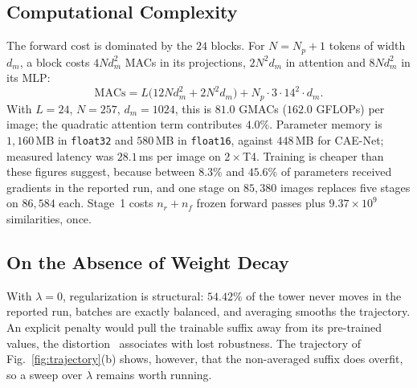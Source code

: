 \documentclass[10pt,journal]{IEEEtran}
\begin{document}
\subsection{Computational Complexity}
The forward cost is dominated by the $24$ blocks. For $N=N_p+1$ tokens of width
$d_m$, a block costs $4Nd_m^2$ MACs in its projections, $2N^2d_m$ in attention
and $8Nd_m^2$ in its MLP:
\begin{equation}
\mathrm{MACs}=L\big(12Nd_m^2+2N^2d_m\big)+N_p\cdot3\cdot14^2\cdot d_m .
\label{eq:macs}
\end{equation}
With $L=24$, $N=257$, $d_m=1024$, this is $81.0$ GMACs ($162.0$ GFLOPs) per
image; the quadratic attention term contributes $4.0\%$. Parameter memory is
$1{,}160$\,MB in \texttt{float32} and $580$\,MB in \texttt{float16}, against
$448$\,MB for CAE-Net; measured latency was $28.1$\,ms per image on
$2\times$T4. Training is cheaper than these figures suggest, because between
$8.3\%$ and $45.6\%$ of parameters received gradients in the reported run, and
one stage on $85{,}380$ images replaces five stages on $86{,}584$ each. Stage~1
costs $n_r+n_f$ frozen forward passes plus $9.37\times10^9$ similarities, once.

\subsection{On the Absence of Weight Decay}
With $\lambda=0$, regularization is structural: $54.42\%$ of the tower never
moves in the reported run, batches are exactly balanced, and averaging smooths
the trajectory. An explicit penalty would pull the trainable suffix away from
its pre-trained values, the distortion~\cite{kumar2022finetuning} associates
with lost robustness. The trajectory of Fig.~\ref{fig:trajectory}(b) shows,
however, that the non-averaged suffix does overfit, so a sweep over $\lambda$
remains worth running.
\end{document}
